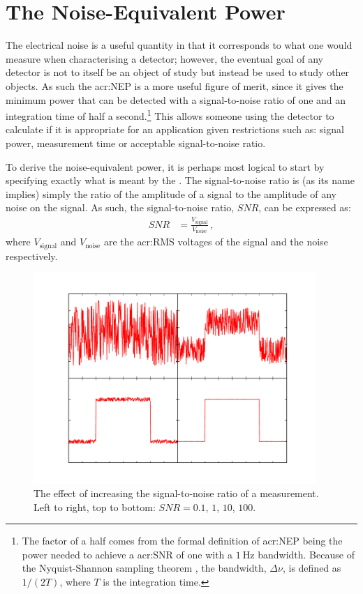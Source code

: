 \section{The Noise-Equivalent Power}
\label{sec:theory-NEP}
The electrical noise is a useful quantity in that it corresponds to what one would measure when characterising a detector; however, the eventual goal of any detector is not to itself be an object of study but instead be used to study other objects. As such the \gls{acr:NEP} is a more useful figure of merit, since it gives the minimum power that can be detected with a signal-to-noise ratio of one and an integration time of half a second.\footnote{The factor of a half comes from the formal definition of \gls{acr:NEP} being the power needed to achieve a \gls{acr:SNR} of one with a $1~\mathrm{Hz}$ bandwidth. Because of the Nyquist-Shannon sampling theorem \parencite{Nyquist1928a,Shannon1949}, the bandwidth, $\Delta\nu$, is defined as $1/\left(2T\right)$, where $T$ is the integration time.} This allows someone using the detector to calculate if it is appropriate for an application given restrictions such as: signal power, measurement time or acceptable signal-to-noise ratio.
\par 
To derive the noise-equivalent power, it is perhaps most logical to start by specifying exactly what is meant by the . The signal-to-noise ratio is (as its name implies) simply the ratio of the amplitude of a signal to the amplitude of any noise on the signal. As such, the signal-to-noise ratio, $\mathit{SNR}$, can be expressed as:
\begin{align}
\mathit{SNR} &= \frac{V_{\mathrm{signal}}}{V_{\mathrm{noise}}} \,, \label{def:SNR}
\end{align}
where $V_{\mathrm{signal}}$ and $V_{\mathrm{noise}}$ are the \gls{acr:RMS} voltages of the signal and the noise respectively.
\begin{figure}[t]
\begin{center}
\includegraphics[width = 0.95\textwidth]{figures/SNR_Example}
\caption[Examples of the physical effects of various signal-to-noise ratios]{The effect of increasing the signal-to-noise ratio of a measurement. Left to right, top to bottom: $\mathit{SNR} = 0.1$, $1$, $10$, $100$.}
\label{fig:SNR_example}
\end{center}
\end{figure}
